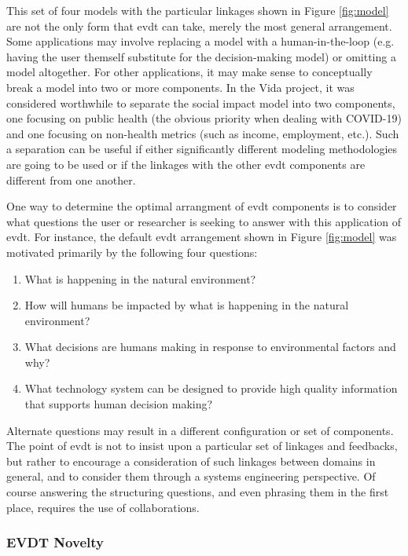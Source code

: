 \documentclass[notitlepage]{article}
\begin{document}
This set of four models with the particular linkages shown in Figure \ref{fig:model} are not the only form that \ac{evdt} can take, merely the most general arrangement. Some applications may involve replacing a model with a human-in-the-loop (e.g. having the user themself substitute for the decision-making model) or omitting a model altogether. For other applications, it may make sense to conceptually break a model into two or more components. In the Vida project, it was considered worthwhile to separate the social impact model into two components, one focusing on public health (the obvious priority when dealing with COVID-19) and one focusing on non-health metrics (such as income, employment, etc.). Such a separation can be useful if either significantly different modeling methodologies are going to be used or if the linkages with the other \ac{evdt} components are different from one another. 

One way to determine the optimal arrangment of \ac{evdt} components is to consider what questions the user or researcher is seeking to answer with this application of \ac{evdt}. For instance, the default \ac{evdt} arrangement shown in Figure \ref{fig:model} was motivated primarily by the following four questions:

\begin{enumerate} \setlength{\itemsep}{0pt} \setlength{\parskip}{0pt}
    \item What is happening in the natural environment?
    \item How will humans be impacted by what is happening in the natural environment?
    \item What decisions are humans making in response to environmental factors and why?
    \item What technology system can be designed to provide high quality information that supports human decision making?
\end{enumerate}

Alternate questions may result in a different configuration or set of components. The point of \ac{evdt} is not to insist upon a particular set of linkages and feedbacks, but rather to encourage a consideration of such linkages between domains in general, and to consider them through a systems engineering perspective. Of course answering the structuring questions, and even phrasing them in the first place, requires the use of collaborations. 

\color{OliveGreen}

\subsubsection{EVDT Novelty}
\end{document}
